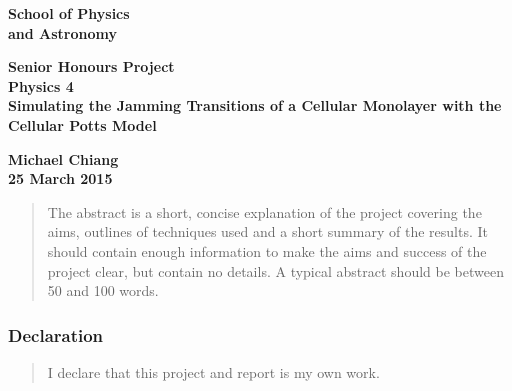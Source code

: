 \documentclass[a4paper,12pt]{article}
\begin{document}
\pagestyle{empty}                       %
\epsfxsize=40mm                         %
\begin{minipage}[b]{110mm}
        {\Huge\bf School of Physics\\ and Astronomy
        \vspace*{17mm}}
\end{minipage}
\hfill
\begin{minipage}[t]{40mm}               
\end{minipage}
\par\noindent                                           %
\vspace*{2cm}
\begin{center}
        \Large\bf \Large\bf Senior Honours Project\\
        \Large\bf Physics 4\\[10pt]                     %
        \LARGE\bf Simulating the Jamming Transitions of a Cellular Monolayer with the Cellular Potts Model        %
\end{center}
\vspace*{0.5cm}
\begin{center}
        \bf Michael Chiang\\                           %
        25 March 2015                                    %
\end{center}
\vspace*{5mm}
%
%                       
\begin{abstract}
        The abstract is a short, concise explanation of the project
        covering the aims, outlines of techniques used and a short
        summary of the results. It should contain enough information to
        make the aims and success of the project clear, but contain no details.
        A typical abstract should be between 50 and 100 words.
\end{abstract}

\vspace*{1cm}

\subsubsection*{Declaration}

\begin{quotation}
        I declare that this project and report is my own work.
\end{quotation}
\end{document}

